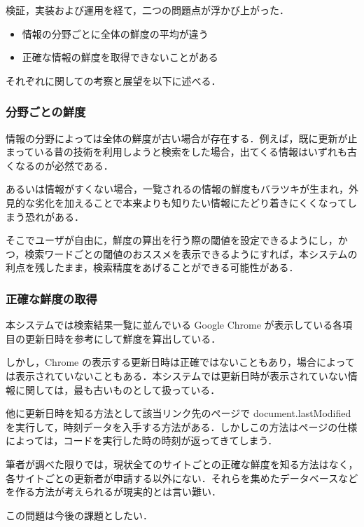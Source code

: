 検証，実装および運用を経て，二つの問題点が浮かび上がった．

\begin{itemize}
  \item 情報の分野ごとに全体の鮮度の平均が違う
  \item 正確な情報の鮮度を取得できないことがある
\end{itemize}

それぞれに関しての考察と展望を以下に述べる．

\subsubsection{分野ごとの鮮度}

情報の分野によっては全体の鮮度が古い場合が存在する．例えば，既に更新が止まっている昔の技術を利用しようと検索をした場合，出てくる情報はいずれも古くなるのが必然である．

あるいは情報がすくない場合，一覧されるの情報の鮮度もバラツキが生まれ，外見的な劣化を加えることで本来よりも知りたい情報にたどり着きにくくなってしまう恐れがある．

そこでユーザが自由に，鮮度の算出を行う際の閾値を設定できるようにし，かつ，検索ワードごとの閾値のおススメを表示できるようにすれば，本システムの利点を残したまま，検索精度をあげることができる可能性がある．

\subsubsection{正確な鮮度の取得}

本システムでは検索結果一覧に並んでいる Google Chrome が表示している各項目の更新日時を参考にして鮮度を算出している．

しかし，Chrome の表示する更新日時は正確ではないこともあり，場合によっては表示されていないこともある．本システムでは更新日時が表示されていない情報に関しては，最も古いものとして扱っている．

他に更新日時を知る方法として該当リンク先のページで document.lastModified を実行して，時刻データを入手する方法がある．しかしこの方法はページの仕様によっては，コードを実行した時の時刻が返ってきてしまう．

筆者が調べた限りでは，現状全てのサイトごとの正確な鮮度を知る方法はなく，各サイトごとの更新者が申請する以外にない．それらを集めたデータベースなどを作る方法が考えられるが現実的とは言い難い．

この問題は今後の課題としたい．

